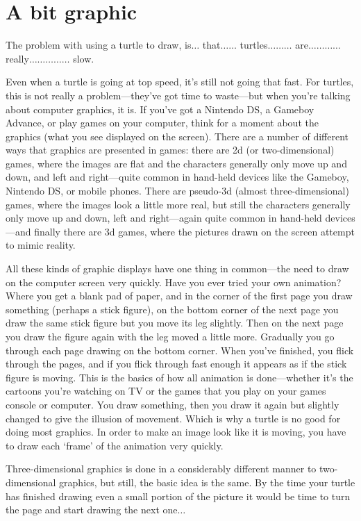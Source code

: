 

\chapter{A bit graphic}\label{ch:abitgraphic}

The problem with using a turtle to draw, is$\ldots$ that$\ldots$$\ldots$ turtles$\ldots$$\ldots$$\ldots$ are$\ldots$$\ldots$$\ldots$$\ldots$ really$\ldots$$\ldots$$\ldots$$\ldots$$\ldots$ slow.
\par
Even when a turtle is going at top speed, it's still not going that fast. For turtles, this is not really a problem---they've got time to waste---but when you're talking about computer graphics, it is. If you've got a Nintendo DS, a Gameboy Advance, or play games on your computer, think for a moment about the graphics (what you see displayed on the screen). There are a number of different ways that graphics are presented in games: there are 2d (or two-dimensional) games, where the images are flat and the characters generally only move up and down, and left and right---quite common in hand-held devices like the Gameboy, Nintendo DS, or mobile phones.  There are pseudo-3d (almost three-dimensional) games, where the images look a little more real, but still the characters generally only move up and down, left and right---again quite common in hand-held devices---and finally there are 3d games, where the pictures drawn on the screen attempt to mimic reality.

All these kinds of graphic displays have one thing in common---the need to draw on the computer screen very quickly.  Have you ever tried your own animation?  Where you get a blank pad of paper, and in the corner of the first page you draw something (perhaps a stick figure), on the bottom corner of the next page you draw the same stick figure but you move its leg slightly. Then on the next page you draw the figure again with the leg moved a little more. Gradually you go through each page drawing on the bottom corner.  When you've finished, you flick through the pages, and if you flick through fast enough it appears as if the stick figure is moving. This is the basics of how all animation is done---whether it's the cartoons you're watching on TV or the games that you play on your games console or computer. You draw something, then you draw it again but slightly changed to give the illusion of movement. Which is why a turtle is no good for doing most graphics.  In order to make an image look like it is moving, you have to draw each `frame' of the animation very quickly.
\par
Three-dimensional graphics is done in a considerably different manner to two-dimensional graphics, but still, the basic idea is the same.  By the time your turtle has finished drawing even a small portion of the picture it would be time to turn the page and start drawing the next one$\ldots$

